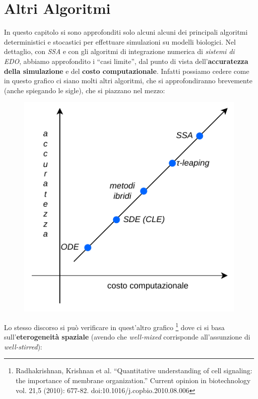 \documentclass[a4paper,12pt, oneside]{book}
\begin{document}
\section{Altri Algoritmi}
In questo capitolo si sono approfonditi solo alcuni alcuni dei principali
algoritmi deterministici e stocastici per effettuare simulazioni su modelli
biologici. Nel dettaglio, con \textit{SSA} e con gli algoritmi di integrazione
numerica di \textit{sistemi di EDO}, abbiamo approfondito i ``casi
limite'', dal punto di vista dell'\textbf{accuratezza della simulazione} e del
\textbf{costo computazionale}. Infatti possiamo cedere come in questo grafico ci
siano molti  
altri algoritmi, che si approfondiranno brevemente (anche spiegando le sigle),
che si piazzano nel mezzo: 
\begin{figure}[H]
  \centering
  \includegraphics[scale = 1]{img/algo.pdf}
\end{figure}
Lo stesso discorso si può verificare in quest'altro grafico
\footnote{Radhakrishnan, Krishnan et al. “Quantitative understanding of cell
  signaling: the importance of membrane organization.” Current opinion in
  biotechnology vol. 21,5 (2010): 677-82. doi:10.1016/j.copbio.2010.08.006} dove
ci si basa sull'\textbf{eterogeneità spaziale} (avendo che \textit{well-mixed}
corrisponde all'assunzione di \textit{well-stirred}):
\end{document}
